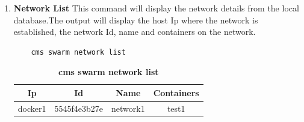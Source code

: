 \documentclass[9pt,twocolumn,twoside]{../../styles/osajnl}
\begin{document}
\begin{enumerate}
\begin{verbatim}
    \end{verbatim}
    \item \textbf{Network List}
     This command will display the network details from the local database.The output will display the host Ip where the network is established, the network Id, name and containers on the network.
    \begin{verbatim}
    cms swarm network list  
    \end{verbatim}
    \begin{table}[htbp]
     \caption{\bf cms swarm network list }
     \begin{tabular}{cccc}
     \hline
      Ip & Id & Name & Containers\\
      \hline
      docker1 & 5545f4e3b27e & network1 & test1  \\
     \hline
     \end{tabular}
     \label{tab:tab6}
     \end{table}
     

\end{enumerate}
\end{document}
